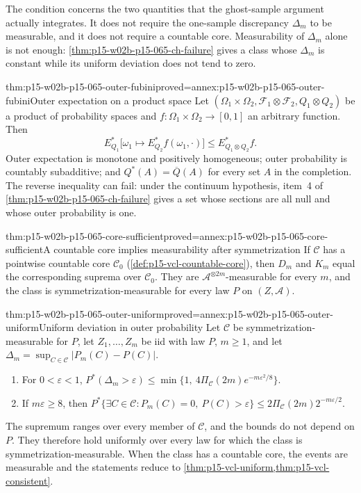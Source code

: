 The condition concerns the two quantities that the ghost-sample argument
actually integrates. It does not require the one-sample discrepancy
\(\Delta_m\) to be measurable, and it does not require a countable core.
Measurability of \(\Delta_m\) alone is not enough:
\cref{thm:p15-w02b-p15-065-ch-failure} gives a class whose \(\Delta_m\)
is constant while its uniform deviation does not tend to zero.

\begin{hblemma}{thm:p15-w02b-p15-065-outer-fubini}{proved=annex:p15-w02b-p15-065-outer-fubini}{Outer expectation on a product space}
Let \((\Omega_1\times\Omega_2,\mathcal F_1\otimes\mathcal F_2,Q_1\otimes Q_2)\)
be a product of probability spaces and \(f:\Omega_1\times\Omega_2\to[0,1]\)
an arbitrary function. Then
\[
 E_{Q_1}^{*}\bigl[\omega_1\mapsto E_{Q_2}^{*}f(\omega_1,\cdot)\bigr]
 \leq E_{Q_1\otimes Q_2}^{*}f .
\]
Outer expectation is monotone and positively homogeneous; outer probability
is countably subadditive; and \(Q^{*}(A)=\overline Q(A)\) for every set
\(A\) in the completion. The reverse inequality can fail: under the
continuum hypothesis, item~4 of \cref{thm:p15-w02b-p15-065-ch-failure}
gives a set whose sections are all null and whose outer probability is one.
\end{hblemma}

\begin{hblemma}{thm:p15-w02b-p15-065-core-sufficient}{proved=annex:p15-w02b-p15-065-core-sufficient}{A countable core implies measurability after symmetrization}
If \(\mathcal C\) has a pointwise countable core \(\mathcal C_0\)
(\cref{def:p15-vcl-countable-core}), then \(D_m\) and \(K_m\) equal the
corresponding suprema over \(\mathcal C_0\). They are
\(\mathcal A^{\otimes2m}\)-measurable for every \(m\), and the class is
symmetrization-\allowbreak measurable for every law \(P\) on \((Z,\mathcal A)\).
\end{hblemma}

\begin{hbtheorem}{thm:p15-w02b-p15-065-outer-uniform}{proved=annex:p15-w02b-p15-065-outer-uniform}{Uniform deviation in outer probability}
Let \(\mathcal C\) be symmetrization-\allowbreak measurable for \(P\), let
\(Z_1,\ldots,Z_m\) be iid with law \(P\), \(m\geq1\), and let
\(\Delta_m=\sup_{C\in\mathcal C}|P_m(C)-P(C)|\).
\begin{enumerate}
\item For \(0<\varepsilon<1\),
      \(P^{*}(\Delta_m>\varepsilon)\leq
      \min\{1,\ 4\Pi_{\mathcal C}(2m)e^{-m\varepsilon^2/8}\}\).
\item If \(m\varepsilon\geq8\), then
      \(P^{*}\{\exists C\in\mathcal C:P_m(C)=0,\ P(C)>\varepsilon\}
      \leq2\Pi_{\mathcal C}(2m)2^{-m\varepsilon/2}\).
\end{enumerate}
The supremum ranges over every member of \(\mathcal C\), and the bounds do
not depend on \(P\). They therefore hold uniformly over every law for which
the class is symmetrization-\allowbreak measurable. When the class has a countable core,
the events are measurable and the statements reduce to
\cref{thm:p15-vcl-uniform,thm:p15-vcl-consistent}.
\end{hbtheorem}

